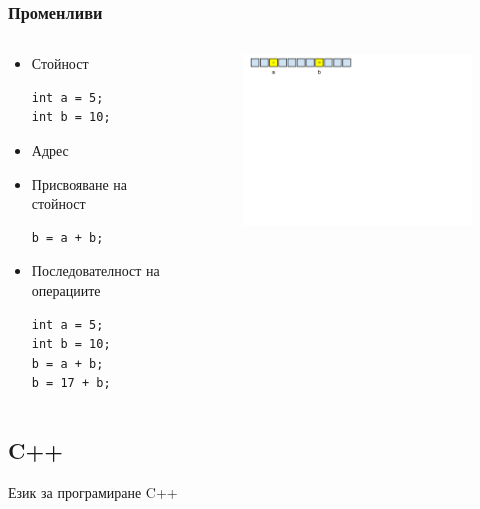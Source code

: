 \documentclass{beamer}
\begin{document}
\begin{frame}[fragile]
\frametitle{Променливи}


\begin{columns}[t]
  \begin{column}{0.7\textwidth}

\begin{itemize}
\item Стойност
\begin{lstlisting}
int a = 5;
int b = 10;
\end{lstlisting}
\item Адрес
\item Присвояване на стойност
\begin{lstlisting}
b = a + b;
\end{lstlisting}
\item Последователност на операциите
\begin{lstlisting}
int a = 5;
int b = 10;
b = a + b;
b = 17 + b;
\end{lstlisting}
\end{itemize}

  \end{column}



  \begin{column}{0.4\textwidth}
\begin{figure}
\includegraphics[width=8.5cm]{images/fig_variables}
\end{figure}
  \end{column}
\end{columns}

\end{frame}

\subsection{C++}

\begin{frame}
\centerline{Език за програмиране C++}
\end{frame}
\end{document}
